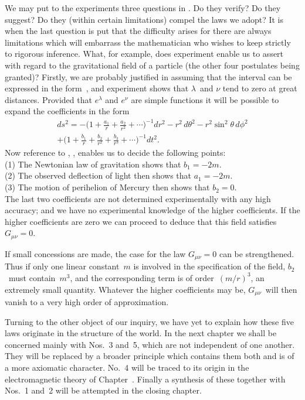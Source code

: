 \documentclass[12pt]{book}
\begin{document}
We may put to the experiments three questions in . Do they
%
%
%
verify? Do they suggest? Do they (within certain limitations) compel the
laws we adopt? It is when the last question is put that the difficulty arises
for there are always limitations which will embarrass the mathematician who
wishes to keep strictly to rigorous inference. What, for example, does experiment
enable us to assert with regard to the gravitational field of a particle
(the other four postulates being granted)? Firstly, we are probably justified
in assuming that the interval can be expressed in the form~, and experiment
shows that $\lambda$~and $\nu$ tend to zero at great distances. Provided that $e^{\lambda}$ and
$e^{\nu}$ are simple functions it will be possible to expand the coefficients in the form
\begin{multline*}
  ds^{2} = -\biggl(1 + \frac{a_{1}}{r} + \frac{a_{2}}{r^{2}} + \cdots\biggr)^{-1} dr^{2}
  - r^{2}\, d\theta^{2} - r^{2}\sin^{2}\theta\, d\phi^{2} \\
  + \biggl(1 + \frac{b_{1}}{r} + \frac{b_{2}}{r^{2}} + \frac{b_{3}}{r^{3}} + \cdots\biggr)^{-1} dt^{2}.
\end{multline*}
Now reference to , ,  enables us to decide the following points: \\
\Indent (1) The Newtonian law of gravitation shows that $b_{1} = -2m$. \\
\Indent (2) The observed deflection of light then shows that $a_{1} = -2m$. \\
\Indent (3) The motion of perihelion of Mercury then shows that $b_{2} = 0$. \\
The last two coefficients are not determined experimentally with any high
accuracy; and we have no experimental knowledge of the higher coefficients.
If the higher coefficients are zero we can proceed to deduce that this field
satisfies $G_{\mu\nu} = 0$.

If small concessions are made, the case for the law $G_{\mu\nu} = 0$ can be
strengthened. Thus if only one linear constant~$m$ is involved in the specification
of the field, $b_{2}$~must contain~$m^{3}$, and the corresponding term is of order~$(m/r)^{3}$,
an extremely small quantity. Whatever the higher coefficients may
be, $G_{\mu\nu}$~will then vanish to a very high order of approximation.

Turning to the other object of our inquiry, we have yet to explain how
these five laws originate in the structure of the world. In the next chapter
we shall be concerned mainly with Nos.~3 and~5, which are not independent
of one another. They will be replaced by a broader principle which contains
them both and is of a more axiomatic character. No.~4 will be traced to its
origin in the electromagnetic theory of Chapter~\@. Finally a synthesis of
these together with Nos.~1 and~2 will be attempted in the closing chapter.
\end{document}
